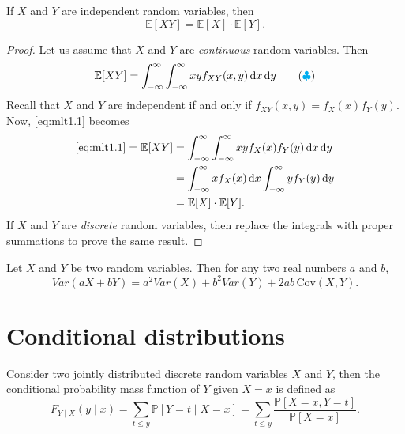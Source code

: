 \begin{theorem}
    If $X$ and $Y$ are independent random variables, then 
    \begin{equation}
        \mathbb{E}[XY] = \mathbb{E}[X] \cdot \mathbb{E}[Y].
    \end{equation}
\end{theorem}
\begin{proof}
    Let us assume that $X$ and $Y$ are \textit{continuous} random variables. Then
    \begin{equation*}
        \mathbb{E}[XY] = \int_{-\infty}^{\infty} \int_{-\infty}^{\infty} xy f_{XY}(x,y) \, \mathrm{d}x \, \mathrm{d}y \label{eq:mlt1.1} \tag{{\color{cyan} $\clubsuit $}}
    \end{equation*}
    Recall that $X$ and $Y$ are independent if and only if $f_{XY}(x,y) = f_X(x) f_Y(y)$. Now, 
    \eqref{eq:mlt1.1} becomes
    \begin{align*}
        \eqref{eq:mlt1.1} = \mathbb{E}[XY] &= \int_{-\infty}^{\infty} \int_{-\infty}^{\infty} xy f_X(x) f_Y(y) \, \mathrm{d}x \, \mathrm{d}y\\
        &= \int_{-\infty}^{\infty} x f_X(x) \, \mathrm{d}x \int_{-\infty}^{\infty} y f_Y(y) \, \mathrm{d}y\\
        &= \mathbb{E}[X] \cdot \mathbb{E}[Y].
    \end{align*}
    If $X$ and $Y$ are \textit{discrete} random variables, then replace the integrals with proper 
    summations to prove the same result.
\end{proof}

\begin{theorem}
    Let $X$ and $Y$ be two random variables. Then for any two real numbers $a$ and $b$, 
    \begin{equation}
        Var(aX + bY) = a^2 Var(X) + b^2 Var(Y) + 2ab\, \text{Cov}(X,Y).
    \end{equation}
\end{theorem}

\section{Conditional distributions}

\begin{definition}
    Consider two jointly distributed discrete random variables $X$ and $Y$, then the conditional probability mass function of $Y$ given $X = x$ is defined as
    \begin{equation}
        F_{Y \mid X}(y \mid x) = \sum_{t \leq y} \mathbb{P}[Y = t \mid X = x] = \sum_{t \leq y} \frac{\mathbb{P}[X = x, Y = t]}{\mathbb{P}[X = x]}. \label{defn:con01}
    \end{equation}
\end{definition}

